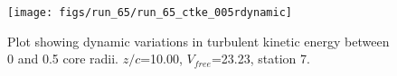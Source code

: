 \begin{figure}[H]
\centering
\texttt{[image: figs/run\_65/run\_65\_ctke\_005rdynamic]}
\caption{Plot showing dynamic variations in turbulent kinetic energy between 0 and 0.5 core radii. $z/c$=10.00, $V_{free}$=23.23, station 7.}
\end{figure}


